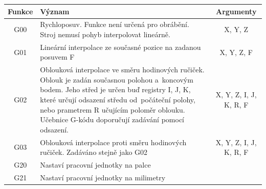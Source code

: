 		\begin{table}
		    \begin{tabularx}{\textwidth}{|c|X|c|}
		        \hline
		        Funkce & Význam                                                                                                                                                                                                                                                                                               & Argumenty              \\ \hline \hline
		        G00    & Rychloposuv. Funkce není určená pro obrábění. Stroj nemusí pohyb interpolovat lineárně.                                                                                                                                                                                                              & X, Y, Z                \\ \hline
		        G01    & Lineární interpolace ze současné pozice na zadanou posuvem F                                                                                                                                                                                                                                         & X, Y, Z, F             \\ \hline
		        G02    & Oblouková interpolace ve směru hodinových ručiček. Oblouk je zadán současnou polohou a~koncovým bodem. Jeho střed je určen buď registry I, J, K, které určují odsazení středu od~počáteční polohy, nebo prametrem R učujícím poloměr oblouku. Učebnice G-kódu doporučují zadávání pomocí odsazení. & X, Y, Z, I, J, K, R, F \\ \hline
		        G03    & Oblouková interpolace proti směru hodinových ručiček. Zadáváno stejně jako G02                                                                                                                                                                                                                       & X, Y, Z, I, J, K, R, F \\ \hline
		        G20    & Nastaví pracovní jednotky na palce                                                                                                                                                                                                                                                                   & ~                      \\ \hline
		        G21    & Nastaví pracovní jednotky na milimetry                                                                                                                                                                                                                                                               & ~                      \\ \hline

\end{tabularx}
\end{table}
